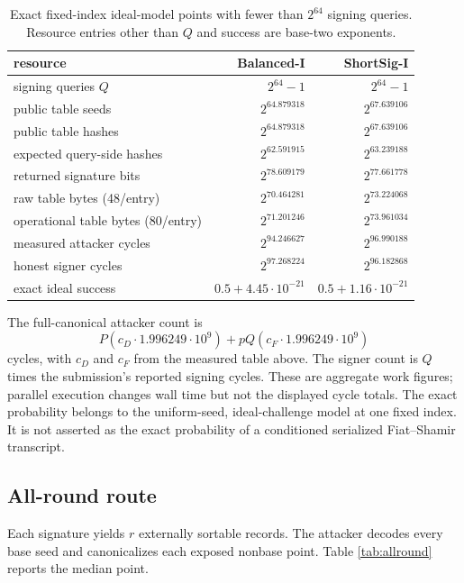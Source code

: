 \documentclass[11pt,a4paper]{article}
\begin{document}
\begin{table}[ht]
\centering
\small
\setlength{\tabcolsep}{5pt}
\caption{Exact fixed-index ideal-model points with fewer than $2^{64}$
signing queries.  Resource entries other than $Q$ and success are base-two
exponents.}
\label{tab:q64}
\begin{tabular}{lrr}
\toprule
resource & Balanced-I & ShortSig-I\\
\midrule
signing queries $Q$ & $2^{64}-1$ & $2^{64}-1$\\
public table seeds & $2^{64.879318}$ & $2^{67.639106}$\\
public table hashes & $2^{64.879318}$ & $2^{67.639106}$\\
expected query-side hashes & $2^{62.591915}$ & $2^{63.239188}$\\
returned signature bits & $2^{78.609179}$ & $2^{77.661778}$\\
raw table bytes (48/entry) & $2^{70.464281}$ & $2^{73.224068}$\\
operational table bytes (80/entry) & $2^{71.201246}$ & $2^{73.961034}$\\
measured attacker cycles & $2^{94.246627}$ & $2^{96.990188}$\\
honest signer cycles & $2^{97.268224}$ & $2^{96.182868}$\\
exact ideal success & $0.5+4.45\mathbin{\cdot}10^{-21}$ &
                      $0.5+1.16\mathbin{\cdot}10^{-21}$\\
\bottomrule
\end{tabular}
\end{table}

The full-canonical attacker count is
\[
 P(c_D\cdot1.996249\cdot10^9)
 +pQ(c_F\cdot1.996249\cdot10^9)
\]
cycles, with $c_D$ and $c_F$ from the measured table above.  The signer count
is $Q$ times the submission's reported signing cycles.  These are aggregate
work figures; parallel execution changes wall time but not the displayed
cycle totals.  The exact probability belongs to the uniform-seed,
ideal-challenge model at one fixed index.  It is not asserted as the exact
probability of a conditioned serialized Fiat--Shamir transcript.

\subsection{All-round route}

Each signature yields $r$ externally sortable records.  The attacker decodes
every base seed and canonicalizes each exposed nonbase point.  Table
\ref{tab:allround} reports the median point.
\end{document}

